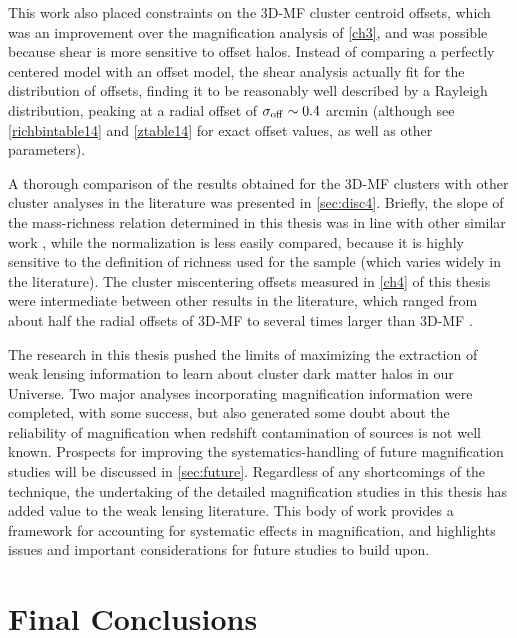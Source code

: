 This work also placed constraints on the \ac{3D-MF} cluster centroid offsets, which was an improvement over the magnification analysis of \autoref{ch3}, and was possible because shear is more sensitive to offset halos. Instead of comparing a perfectly centered model with an offset model, the shear analysis actually fit for the distribution of offsets, finding it to be reasonably well described by a Rayleigh distribution, peaking at a radial offset of $\sigma_{\rm off} \sim 0.4$ arcmin (although see \autoref{richbintable14} and \autoref{ztable14} for exact offset values, as well as other parameters). 

A thorough comparison of the results obtained for the \ac{3D-MF} clusters with other cluster analyses in the literature was presented in \autoref{sec:disc4}. Briefly, the slope of the mass-richness relation determined in this thesis was in line with other similar work \citep{Wen12,Covone14}, while the normalization is less easily compared, because it is highly sensitive to the definition of richness used for the sample (which varies widely in the literature). The cluster miscentering offsets measured in \autoref{ch4} of this thesis were intermediate between other results in the literature, which ranged from about half the radial offsets of \ac{3D-MF} \citep{George12} to several times larger than \ac{3D-MF} \citep{Johnston07}.

The research in this thesis pushed the limits of maximizing the extraction of weak lensing information to learn about cluster dark matter halos in our Universe. Two major analyses incorporating magnification information were completed, with some success, but also generated some doubt about the reliability of magnification when redshift contamination of sources is not well known. Prospects for improving the systematics-handling of future magnification studies will be discussed in \autoref{sec:future}. Regardless of any shortcomings of the technique, the undertaking of the detailed magnification studies in this thesis has added value to the weak lensing literature. This body of work provides a framework for accounting for systematic effects in magnification, and highlights issues and important considerations for future studies to build upon.


\section{Final Conclusions}
\label{sec:conc}

